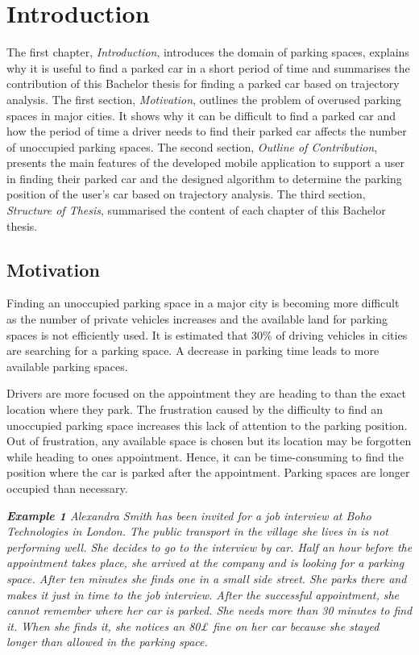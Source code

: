 \chapter{Introduction}

The first chapter, \textit{Introduction}, introduces the domain of parking spaces, explains why it is useful to find a parked car in a short period of time and summarises the contribution of this Bachelor thesis for finding a parked car based on trajectory analysis.
The first section, \textit{Motivation}, outlines the problem of overused parking spaces in major cities. It shows why it can be difficult to find a parked car and how the period of time a driver needs to find their parked car affects the number of unoccupied parking spaces.
The second section, \textit{Outline of Contribution}, presents the main features of the developed mobile application to support a user in finding their parked car and the designed algorithm to determine the parking position of the user's car based on trajectory analysis. 
The third section, \textit{Structure of Thesis}, summarised the content of each chapter of this Bachelor thesis.


\section{Motivation}
Finding an unoccupied parking space in a major city is becoming more difficult as the number of private vehicles increases and the available land for parking spaces is not efficiently used. It is estimated that 30\% of driving vehicles in cities are searching for a parking space. A decrease in parking time leads to more available parking spaces. \cite{wu2007robust}\cite{Ibrahim2018}\cite{Geng2012}

Drivers are more focused on the appointment they are heading to than the exact location where they park. The frustration caused by the difficulty to find an unoccupied parking space increases this lack of attention to the parking position. Out of frustration, any available space is chosen but its location may be forgotten while heading to ones appointment. Hence, it can be time-consuming to find the position where the car is parked after the appointment. Parking spaces are longer occupied than necessary.
  
\textit{\textbf{Example 1}
Alexandra Smith has been invited for a job interview at Boho Technologies in London. The public transport in the village she lives in is not performing well. She decides to go to the interview by car. Half an hour before the appointment takes place, she arrived at the company and is looking for a parking space. After ten minutes she finds one in a small side street. She parks there and makes it just in time to the job interview. After the successful appointment, she cannot remember where her car is parked. She needs more than 30 minutes to find it. When she finds it, she notices an 80£ fine on her car because she stayed longer than allowed in the parking space.
}


